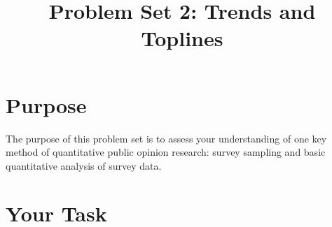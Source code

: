 \documentclass[a4paper]{exam}
\title{Problem Set 2: Trends and Toplines}
\date{}
\begin{document}
\vspace{-4em}
\maketitle

\section{Purpose}\label{purpose}

The purpose of this problem set is to assess your understanding of one key method of quantitative public opinion research: survey sampling and basic quantitative analysis of survey data.

\section{Your Task}\label{your-task}
\end{document}
